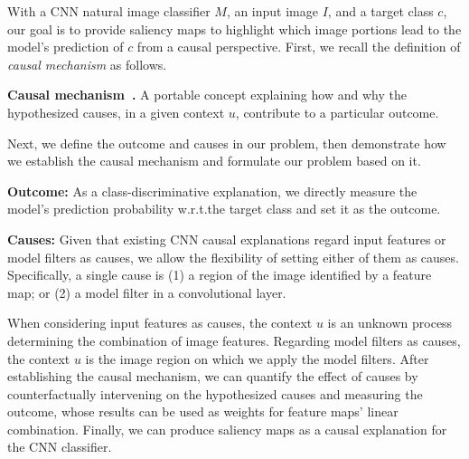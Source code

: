 With a CNN natural image classifier $M$, an input image $I$, and a target class $c$, our goal is to provide saliency maps to highlight which image portions lead to the model's prediction of $c$ from a causal perspective.
First, we recall the definition of \textit{causal mechanism} as follows.

\noindent\textbf{Causal mechanism~\cite{falleti2009context}.}
A portable concept explaining how and why the hypothesized causes, in a given context $u$, contribute to a particular outcome. 

Next, we define the outcome and causes in our problem, then demonstrate how we establish the causal mechanism and formulate our problem based on it.

\noindent\textbf{Outcome: }
As a class-discriminative explanation, we directly measure the model's prediction probability w.r.t.\;the target class and set it as the outcome.

\noindent\textbf{Causes: }
Given that existing CNN causal explanations regard input features or model filters as causes, we allow the flexibility of setting either of them as causes.
Specifically, a single cause is (1) a region of the image identified by a feature map; or (2) a model filter in a convolutional layer.

When considering input features as causes, the context $u$ is an unknown process determining the combination of image features.
Regarding model filters as causes, the context $u$ is the image region on which we apply the model filters.
After establishing the causal mechanism, we can quantify the effect of causes by counterfactually intervening on the hypothesized causes and measuring the outcome, whose results can be used as weights for feature maps' linear combination.
Finally, we can produce saliency maps as a causal explanation for the CNN classifier.
